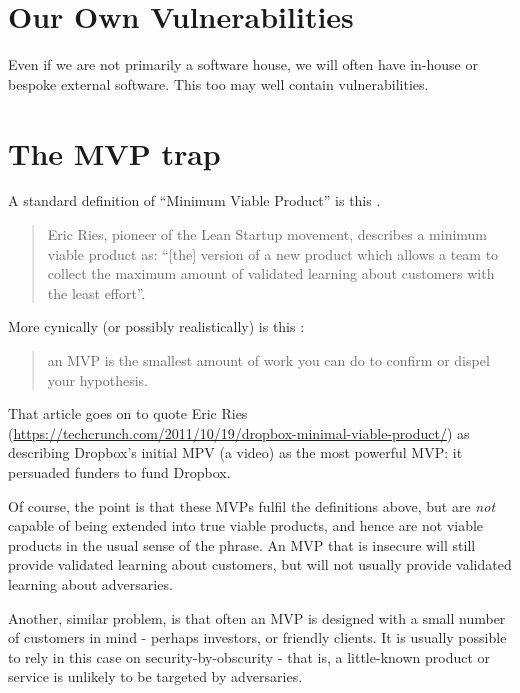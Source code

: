 \documentclass{article}
\begin{document}
\section{Our Own Vulnerabilities}
Even if we are not primarily a software house, we will often have in-house or bespoke external software. This too may well contain vulnerabilities.
\section{The MVP trap}
A standard definition of ``Minimum Viable Product'' is this \cite{BL2016a}.
\begin{quote}
Eric Ries, pioneer of the Lean Startup movement, describes a minimum viable product as: ``[the] version of a new product which allows a team to collect the maximum amount of validated learning about customers with the least effort''.
\end{quote}
More cynically (or possibly realistically) is this \cite{Kamps2022a}:
\begin{quote}
an MVP is the smallest amount of work you can do to confirm or dispel your hypothesis.
\end{quote}
That article goes on to quote Eric Ries (\url{https://techcrunch.com/2011/10/19/dropbox-minimal-viable-product/}) as describing Dropbox's initial MPV (a video) as the most powerful MVP: it persuaded funders to fund Dropbox.
\par
Of course, the point is that these MVPs fulfil the definitions above, but are \emph{not} capable of being extended into true viable products, and hence are not viable products in the usual sense of the phrase. An MVP that is insecure will still provide validated learning about customers, but will not usually provide validated learning about adversaries.
\par
Another, similar problem, is that often an MVP is designed with a small number of customers in mind - perhaps investors, or friendly clients. It is usually possible to rely in this case on security-by-obscurity - that is, a little-known product or service is unlikely to be targeted by adversaries.
\end{document}

